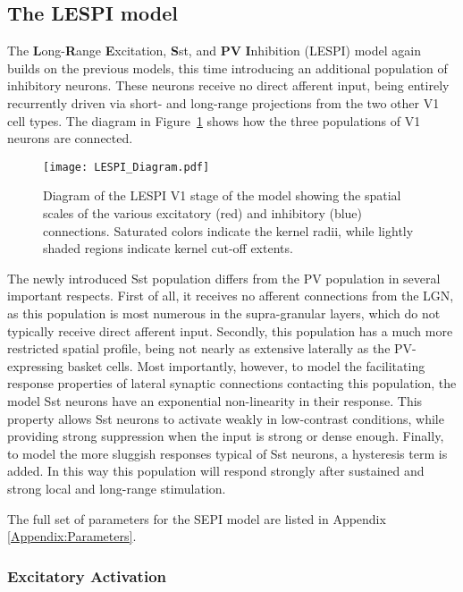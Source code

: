 \subsection{The LESPI model}

The \textbf{L}ong-\textbf{R}ange \textbf{E}xcitation, \textbf{S}st,
and \textbf{PV} \textbf{I}nhibition (LESPI) model again builds on the
previous models, this time introducing an additional population of
inhibitory neurons.  These neurons receive no direct afferent input,
being entirely recurrently driven via short- and long-range
projections from the two other V1 cell types. The diagram in
Figure~\ref{LESPIDiagram} shows how the three populations of V1
neurons are connected.

\begin{figure}
	\centering
        \texttt{[image: LESPI\_Diagram.pdf]}
	\caption{Diagram of the LESPI V1 stage of the model showing the
      spatial scales of the various excitatory (red) and inhibitory
      (blue) connections. Saturated colors indicate the kernel radii,
      while lightly shaded regions indicate kernel cut-off extents.}
	\label{LESPIDiagram}
\end{figure}

The newly introduced Sst population differs from the PV population in
several important respects. First of all, it receives no afferent
connections from the LGN, as this population is most numerous in the
supra-granular layers, which do not typically receive direct afferent
input. Secondly, this population has a much more restricted spatial
profile, being not nearly as extensive laterally as the PV-expressing
basket cells. Most importantly, however, to model the facilitating
response properties of lateral synaptic connections contacting this
population, the model Sst neurons have an exponential non-linearity in
their response. This property allows Sst neurons to activate weakly in
low-contrast conditions, while providing strong suppression when the
input is strong or dense enough. Finally, to model the more sluggish
responses typical of Sst neurons, a hysteresis term is added. In this
way this population will respond strongly after sustained and strong
local and long-range stimulation.

The full set of parameters for the SEPI model are listed in Appendix
\ref{Appendix:Parameters}.

\subsubsection*{Excitatory Activation}

